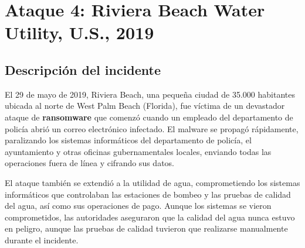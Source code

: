 



\newpage
\section{Ataque 4: Riviera Beach Water Utility, U.S., 2019}

\subsection{Descripción del incidente}
El 29 de mayo de 2019, Riviera Beach, una pequeña ciudad de 35.000 habitantes ubicada al norte de West Palm Beach (Florida), fue víctima de un devastador ataque de \textbf{ransomware} que comenzó cuando un empleado del departamento de policía abrió un correo electrónico infectado. El malware se propagó rápidamente, paralizando los sistemas informáticos del departamento de policía, el ayuntamiento y otras oficinas gubernamentales locales, enviando todas las operaciones fuera de línea y cifrando sus datos.

El ataque también se extendió a la utilidad de agua, comprometiendo los sistemas informáticos que controlaban las estaciones de bombeo y las pruebas de calidad del agua, así como sus operaciones de pago. Aunque los sistemas se vieron comprometidos, las autoridades aseguraron que la calidad del agua nunca estuvo en peligro, aunque las pruebas de calidad tuvieron que realizarse manualmente durante el incidente.

